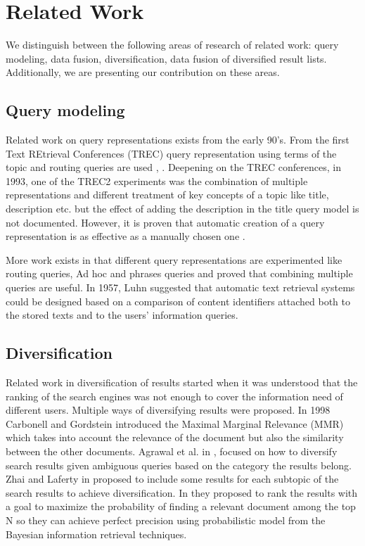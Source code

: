 
\chapter{Related Work}

We distinguish between the following areas of research of related work: query modeling, data fusion, diversification, data fusion of diversified result lists. Additionally, we are presenting our contribution on these areas.

\section{Query modeling}
Related work on query representations exists from the early 90's. From the first Text REtrieval Conferences (TREC) query representation using terms of the topic and routing queries are used \cite{Trec1}, \cite{Trec2}. Deepening on the TREC conferences, in 1993, one of the TREC2 experiments was the combination of multiple representations and different treatment of key concepts of a topic like title, description etc. but the effect of adding the description in the title query model is not documented. However, it is proven that automatic creation of a query representation is as effective as a manually chosen one \cite{Trec2}.

More work exists in \cite{CallanCroft} that different query representations are experimented like routing queries, Ad hoc and phrases queries and proved that combining multiple queries are useful. In 1957, Luhn \cite{Luhn} suggested that automatic text retrieval systems could be designed based on a comparison of content identifiers attached both to the stored texts and to the users’ information queries.

\section{Diversification}
Related work in diversification of results started when it was understood that the ranking of the search engines was not enough to cover the information need of different users. Multiple ways of diversifying results were proposed. In 1998 Carbonell and Gordstein \cite{CarbonellGoldstein} introduced the Maximal Marginal Relevance (MMR) which takes into account the relevance of the document but also the similarity between the other documents. Agrawal et al. in \cite{Agrawal}, focused on how to diversify search results given ambiguous queries based on the category the results belong. Zhai and Laferty in \cite{ZhaiLaferty06} proposed to include some results for each subtopic of the search results to achieve diversification. In \cite{ChenKarger} they proposed to rank the results with a goal to maximize the probability of finding a relevant document among the top N so they can achieve perfect precision using probabilistic model from the Bayesian information retrieval techniques.

